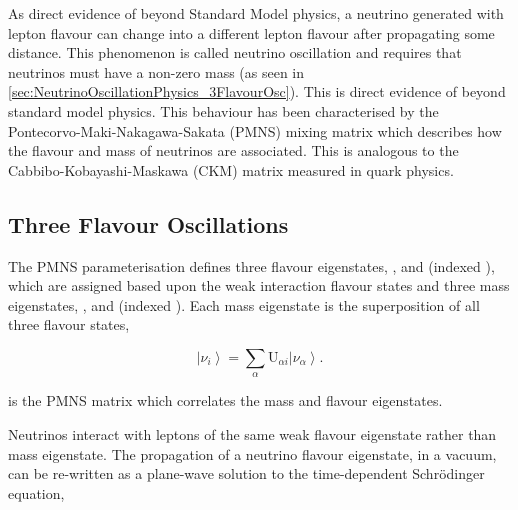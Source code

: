 As direct evidence of beyond Standard Model physics, a neutrino generated with lepton flavour \quickmath{\alpha} can change into a different lepton flavour \quickmath{\beta} after propagating some distance. This phenomenon is called neutrino oscillation and requires that neutrinos must have a non-zero mass (as seen in \autoref{sec:NeutrinoOscillationPhysics_3FlavourOsc}). This is direct evidence of beyond standard model physics. This behaviour has been characterised by the Pontecorvo-Maki-Nakagawa-Sakata (PMNS) \cite{p1,p2,km} mixing matrix which describes how the flavour and mass of neutrinos are associated. This is analogous to the Cabbibo-Kobayashi-Maskawa (CKM) \cite{cabbibo} matrix measured in quark physics.

\subsection{Three Flavour Oscillations}
\label{sec:NeutrinoOscillationPhysics_3FlavourOsc}

The PMNS parameterisation defines three flavour eigenstates, , \quickmath{\nu_{\mu}} and \quickmath{\nu_{\tau}} (indexed \quickmath{\nu_{\alpha}}), which are assigned based upon the weak interaction flavour states and three mass eigenstates, ,  and  (indexed ). Each mass eigenstate is the superposition of all three flavour states,

\begin{equation}
  \label{eq:NeutrinoOscillationPhysics_Superposition}
  \left|\nu_{i}\right> = \sum_{\alpha}\mathrm{U}_{\alpha i}\left|\nu_{\alpha}\right>.
\end{equation}

 is the PMNS matrix which correlates the mass and flavour eigenstates.
%

%
Neutrinos interact with leptons of the same weak flavour eigenstate rather than mass eigenstate. The propagation of a neutrino flavour eigenstate, in a vacuum, can be re-written as a plane-wave solution to the time-dependent Schr{\"o}dinger equation,

